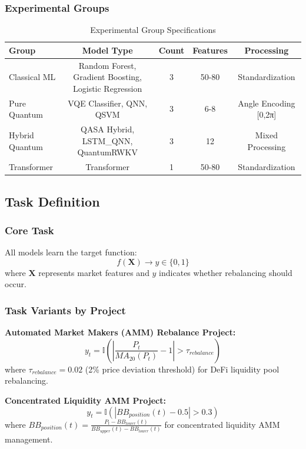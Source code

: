 \documentclass[12pt,a4paper]{article}
\begin{document}
\subsubsection{Experimental Groups}
\begin{table}[H]
\centering
\begin{tabular}{@{}lcccc@{}}
\toprule
\textbf{Group} & \textbf{Model Type} & \textbf{Count} & \textbf{Features} & \textbf{Processing} \\
\midrule
Classical ML & Random Forest, Gradient Boosting, Logistic Regression & 3 & 50-80 & Standardization \\
Pure Quantum & VQE Classifier, QNN, QSVM & 3 & 6-8 & Angle Encoding [0,2π] \\
Hybrid Quantum & QASA Hybrid, LSTM\_QNN, QuantumRWKV & 3 & 12 & Mixed Processing \\
Transformer & Transformer & 1 & 50-80 & Standardization \\
\bottomrule
\end{tabular}
\caption{Experimental Group Specifications}
\end{table}

\subsection{Task Definition}

\subsubsection{Core Task}
All models learn the target function:
\begin{equation}
f(\mathbf{X}) \rightarrow y \in \{0,1\}
\end{equation}
where $\mathbf{X}$ represents market features and $y$ indicates whether rebalancing should occur.

\subsubsection{Task Variants by Project}

\textbf{Automated Market Makers (AMM) Rebalance Project:}
\begin{equation}
y_t = \mathbb{I}\left(\left|\frac{P_t}{MA_{20}(P_t)} - 1\right| > \tau_{rebalance}\right)
\end{equation}
where $\tau_{rebalance} = 0.02$ (2\% price deviation threshold) for DeFi liquidity pool rebalancing.

\textbf{Concentrated Liquidity AMM Project:}
\begin{equation}
y_t = \mathbb{I}\left(\left|BB_{position}(t) - 0.5\right| > 0.3\right)
\end{equation}
where $BB_{position}(t) = \frac{P_t - BB_{lower}(t)}{BB_{upper}(t) - BB_{lower}(t)}$ for concentrated liquidity AMM management.
\end{document}
